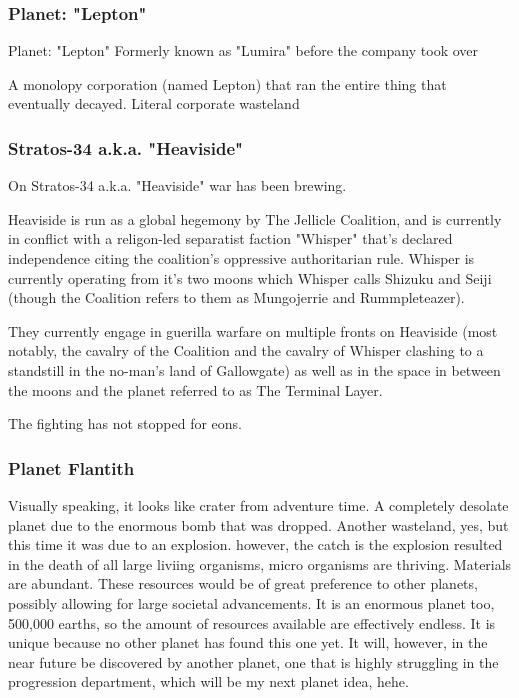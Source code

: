 \documentclass[12pt, titlepage]{article}
\begin{document}
\subsubsection{Planet: "Lepton"}
Planet: "Lepton" Formerly known as "Lumira" before the company took over

A monolopy corporation (named Lepton) that ran the entire thing that eventually decayed. Literal corporate wasteland 

\subsubsection{Stratos-34 a.k.a. "Heaviside"}

On Stratos-34 a.k.a. "Heaviside" war has been brewing.

Heaviside is run as a global hegemony by The Jellicle Coalition, and is currently in conflict with a religon-led separatist faction "Whisper" that's declared independence citing the coalition's oppressive authoritarian rule. Whisper is currently operating from it's two moons which Whisper calls Shizuku and Seiji (though the Coalition refers to them as Mungojerrie and Rummpleteazer).

They currently engage in guerilla warfare on multiple fronts on Heaviside (most notably, the cavalry of the Coalition and the cavalry of Whisper clashing to a standstill in the no-man's land of Gallowgate) as well as in the space in between the moons and the planet referred to as The Terminal Layer.

The fighting has not stopped for eons. 

\subsubsection{Planet Flantith}

Visually speaking, it looks like crater from adventure time. A completely desolate planet due to the enormous bomb that was dropped. Another wasteland, yes, but this time it was due to an explosion. however, the catch is the explosion resulted in the death of all large liviing organisms, micro organisms are thriving. Materials are abundant. These resources would be of great preference to other planets, possibly allowing for large societal advancements. It is an enormous planet too, 500,000 earths, so the amount of resources available are effectively endless. It is unique because no other planet has found this one yet. It will, however, in the near future be discovered by another planet, one that is highly struggling in the progression department, which will be my next planet idea, hehe.
\end{document}

